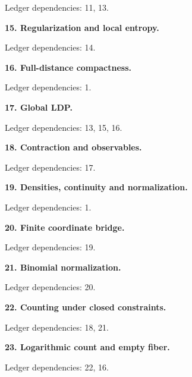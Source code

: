 \documentclass[english,11pt,a4paper]{article}
\begin{document}

Ledger dependencies: 11, 13.

\textbf{15. Regularization and local entropy.}


Ledger dependencies: 14.

\textbf{16. Full-distance compactness.}


Ledger dependencies: 1.

\textbf{17. Global LDP.}


Ledger dependencies: 13, 15, 16.

\textbf{18. Contraction and observables.}


Ledger dependencies: 17.

\textbf{19. Densities, continuity and normalization.}


Ledger dependencies: 1.

\textbf{20. Finite coordinate bridge.}


Ledger dependencies: 19.

\textbf{21. Binomial normalization.}


Ledger dependencies: 20.

\textbf{22. Counting under closed constraints.}


Ledger dependencies: 18, 21.

\textbf{23. Logarithmic count and empty fiber.}


Ledger dependencies: 22, 16.
\end{document}
